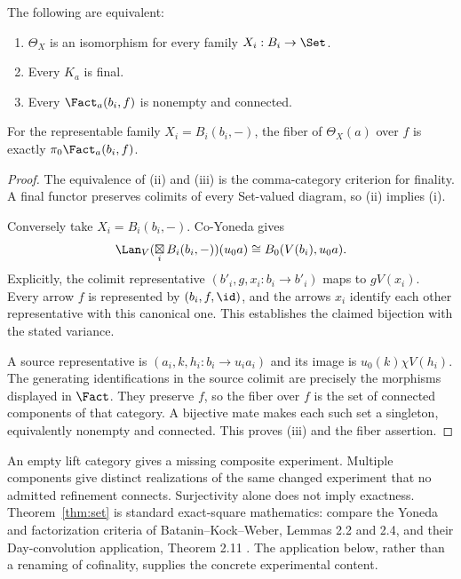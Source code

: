 \begin{theorem}\label{thm:set}
The following are equivalent:
\begin{enumerate}[label=(\roman*)]
\item $\Theta_X$ is an isomorphism for every family $X_i:B_i\to\Set$.
\item Every $K_a$ is final.
\item Every $\Fact_a(b_i,f)$ is nonempty and connected.
\end{enumerate}
For the representable family $X_i=B_i(b_i,-)$, the fiber of
$\Theta_X(a)$ over $f$ is exactly $\pi_0\Fact_a(b_i,f)$.
\end{theorem}
\begin{proof}
The equivalence of (ii) and (iii) is the comma-category criterion for
finality. A final functor preserves colimits of every Set-valued diagram,
so (ii) implies (i).

Conversely take $X_i=B_i(b_i,-)$. Co-Yoneda gives
\[
 \Lan_V(\mathop{\boxtimes}_i B_i(b_i,-))(u_0a)
       \cong B_0(V(b_i),u_0a).
\]
Explicitly, the colimit representative
$(b'_i,g,x_i:b_i\to b'_i)$ maps to $gV(x_i)$. Every arrow $f$ is
represented by $(b_i,f,\id)$, and the arrows $x_i$ identify each other
representative with this canonical one. This establishes the claimed
bijection with the stated variance.

A source representative is $(a_i,k,h_i:b_i\to u_i a_i)$ and its image
is $u_0(k)\chi V(h_i)$. The generating identifications in the source
colimit are precisely the morphisms displayed in $\Fact$. They preserve
$f$, so the fiber over $f$ is the set of connected components of that
category. A bijective mate makes each such set a singleton, equivalently
nonempty and connected. This proves (iii) and the fiber assertion.
\end{proof}

An empty lift category gives a missing composite experiment. Multiple
components give distinct realizations of the same changed experiment
that no admitted refinement connects. Surjectivity alone does not imply
exactness. Theorem~\ref{thm:set} is standard exact-square mathematics:
compare the Yoneda and factorization criteria of
Batanin--Kock--Weber, Lemmas 2.2 and 2.4, and their Day-convolution
application, Theorem 2.11 \cite{BKW}. The application below, rather than
a renaming of cofinality, supplies the concrete experimental content.

